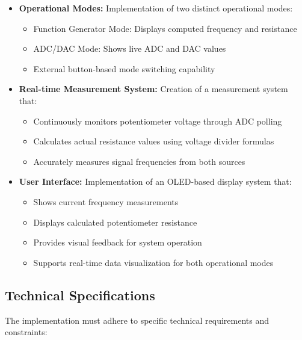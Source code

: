 \begin{itemize}[leftmargin=2em]
    \item \textbf{Operational Modes:} Implementation of two distinct operational modes:
    \begin{itemize}
        \item Function Generator Mode: Displays computed frequency and resistance
        \item ADC/DAC Mode: Shows live ADC and DAC values
        \item External button-based mode switching capability
    \end{itemize}
    
    \item \textbf{Real-time Measurement System:} Creation of a measurement system that:
    \begin{itemize}
        \item Continuously monitors potentiometer voltage through ADC polling
        \item Calculates actual resistance values using voltage divider formulas
        \item Accurately measures signal frequencies from both sources
    \end{itemize}
    
    \item \textbf{User Interface:} Implementation of an OLED-based display system that:
    \begin{itemize}
        \item Shows current frequency measurements
        \item Displays calculated potentiometer resistance
        \item Provides visual feedback for system operation
        \item Supports real-time data visualization for both operational modes
    \end{itemize}
\end{itemize}

\subsection{Technical Specifications}
The implementation must adhere to specific technical requirements and constraints:

